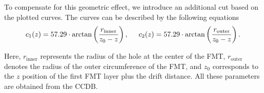     To compensate for this geometric effect, we introduce an additional cut based on the plotted curves.
    The curves can be described by the following equations
    \begin{equation} \label{eq::12.42::fmt_geometry_cut}
        c_1(z) = 57.29 \cdot \arctan\left(\frac{r_\text{inner}}{z_0 - z}\right),
        \hspace{0.5cm}
        c_2(z) = 57.29 \cdot \arctan\left(\frac{r_\text{outer}}{z_0 - z}\right).
    \end{equation}

    Here, $r_\text{inner}$ represents the radius of the hole at the center of the FMT, $r_\text{outer}$ denotes the radius of the outer circumference of the FMT, and $z_0$ corresponds to the $z$ position of the first FMT layer plus the drift distance.
    All these parameters are obtained from the CCDB.
